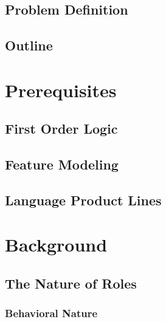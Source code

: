 \documentclass[english,ngerman,BCOR=6mm,cdgeometry=no,DIV=13,twoside,cdmath=false]{tudscrreprt}
\begin{document}
\blindtext

\section{Problem Definition}\label{problem-definition}

\blindtext

\section{Outline}\label{outline}

\chapter{Prerequisites}\label{prerequisites}

\section{First Order Logic}\label{first-order-logic}

\blindtext

\section{Feature Modeling}\label{feature-modeling}

\blindtext

\section{Language Product Lines}\label{language-product-lines}

\chapter{Background}\label{background-1}

\blindtext

\section{The Nature of Roles}\label{the-nature-of-roles}

\blindtext

\subsection{Behavioral Nature}\label{behavioral-nature}

\blindtext
\end{document}
